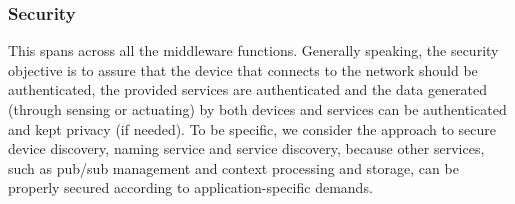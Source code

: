 \subsubsection{Security}
This spans across all the middleware functions. Generally speaking, the security objective is to assure that the device that connects to the network should be authenticated, the provided services are authenticated and the data generated (through sensing or actuating) by both devices and services can be authenticated and kept privacy (if needed). To be specific, we consider the approach to secure device discovery, naming service and service discovery, because other services, such as pub/sub management and context processing and storage, can be properly secured according to application-specific demands.